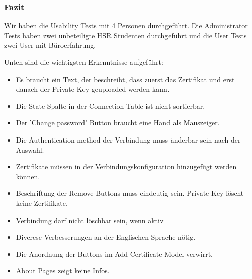 \subsubsection{Fazit}
Wir haben die Usability Tests mit 4 Personen durchgeführt. Die Administrator Tests haben zwei unbeteiligte HSR Studenten durchgeführt und die User Tests zwei User mit Büroerfahrung.

Unten sind die wichtigsten Erkenntnisse aufgeführt:
\begin{itemize}
    \item Es braucht ein Text, der beschreibt, dass zuerst das Zertifikat und erst danach der Private Key geuploaded werden kann.
    \item Die State Spalte in der Connection Table ist nicht sortierbar.
    \item Der 'Change password' Button braucht eine Hand als Mauszeiger.
    \item Die Authentication method der Verbindung muss änderbar sein nach der Auswahl.
    \item Zertifikate müssen in der Verbindungskonfiguration hinzugefügt werden können.
    \item Beschriftung der Remove Buttons muss eindeutig sein. Private Key löscht keine Zertifikate.
    \item Verbindung darf nicht löschbar sein, wenn aktiv
    \item Diverese Verbesserungen an der Englischen Sprache nötig.
    \item Die Anordnung der Buttons im Add-Certificate Model verwirrt.
    \item About Pages zeigt keine Infos.
\end{itemize}
